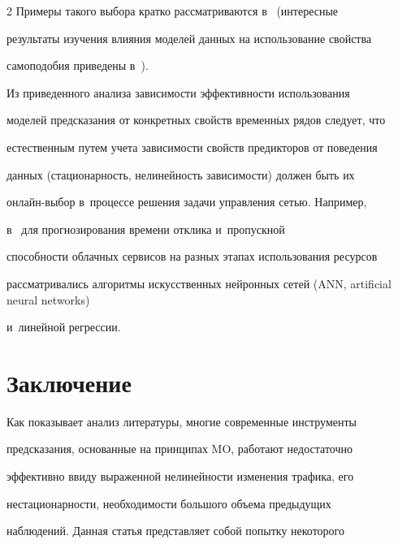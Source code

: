 \begin{multicols}{2}
Примеры такого выбора кратко рас\-смат\-ри\-ва\-ют\-ся в~\cite{26-fr} (интересные 


результаты изучения влияния моделей данных на использование свойства 


самоподобия приведены в~\cite{27-fr}). 


  


  Из приведенного анализа зависимости эффективности использования 


моделей предсказания от конкретных свойств временн$\acute{\mbox{ы}}$х рядов следует, что 


естественным путем учета зависимости свойств предикторов от поведения 


данных (стационарность, нелинейность зависимости) должен быть их  


он\-лайн-вы\-бор в~процессе решения задачи управления сетью. Например, 


в~\cite{27-fr} для прогнозирования времени отклика и~пропускной 


способности облачных сервисов на разных этапах использования ресурсов 


рассматривались алгоритмы искусственных нейронных сетей (ANN, artificial neural networks) 


и~линейной регрессии. 










\section{Заключение}










  Как показывает анализ литературы, многие современные инструменты 


предсказания, основанные на принципах MO, работают недостаточно 


эффективно ввиду выраженной нелинейности \mbox{изменения} трафика, его 


нестационарности, необходимости большого объема предыду\-щих 


наблюдений. Данная статья представляет собой попытку некоторого 



\end{multicols}
